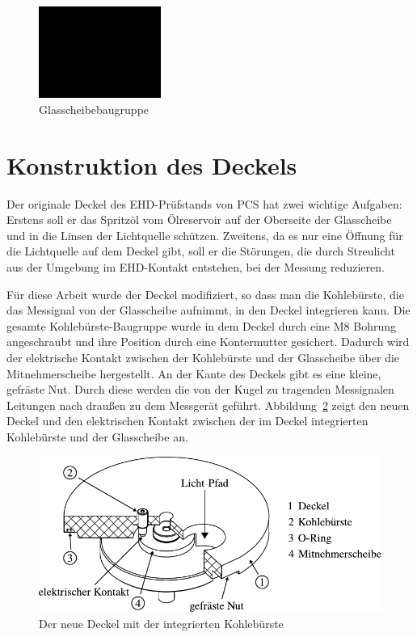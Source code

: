 \begin{figure}[htb]
    \centering
    \includegraphics[width=4cm]{./images/blank_img.jpg}
    \caption{Glasscheibebaugruppe}
    \label{fig:glasscheibebaugruppe}
\end{figure}

\section{Konstruktion des Deckels}
\label{sec:konstruktion_des_deckels}

Der originale Deckel des EHD-Prüfstands von PCS hat zwei wichtige Aufgaben:
Erstens soll er das Spritzöl vom Ölreservoir auf der Oberseite der Glasscheibe und in die Linsen der Lichtquelle schützen.
Zweitens, da es nur eine Öffnung für die Lichtquelle auf dem Deckel gibt, soll er die Störungen, die durch Streulicht aus der Umgebung im EHD-Kontakt entstehen, bei der Messung reduzieren.

Für diese Arbeit wurde der Deckel modifiziert, so dass man die Kohlebürste, die das Messignal von der Glasscheibe aufnimmt, in den Deckel integrieren kann.
Die gesamte Kohlebürste-Baugruppe wurde in dem Deckel durch eine M8 Bohrung angeschraubt und ihre Position durch eine Kontermutter gesichert.
Dadurch wird der elektrische Kontakt zwischen der Kohlebürste und der Glasscheibe über die Mitnehmerscheibe hergestellt.
An der Kante des Deckels gibt es eine kleine, gefräste Nut.
Durch diese werden die von der Kugel zu tragenden Messignalen Leitungen nach draußen zu dem Messgerät geführt.
Abbildung~\ref{fig:deckel_mit_kohlebuersten} zeigt den neuen Deckel und den elektrischen Kontakt zwischen der im Deckel integrierten Kohlebürste und der Glasscheibe an.

\begin{figure}[htb]
    \centering
    \includegraphics[]{./images/deckel_und_scheibe.pdf}
    \caption{Der neue Deckel mit der integrierten Kohlebürste}
    \label{fig:deckel_mit_kohlebuersten}
\end{figure}
